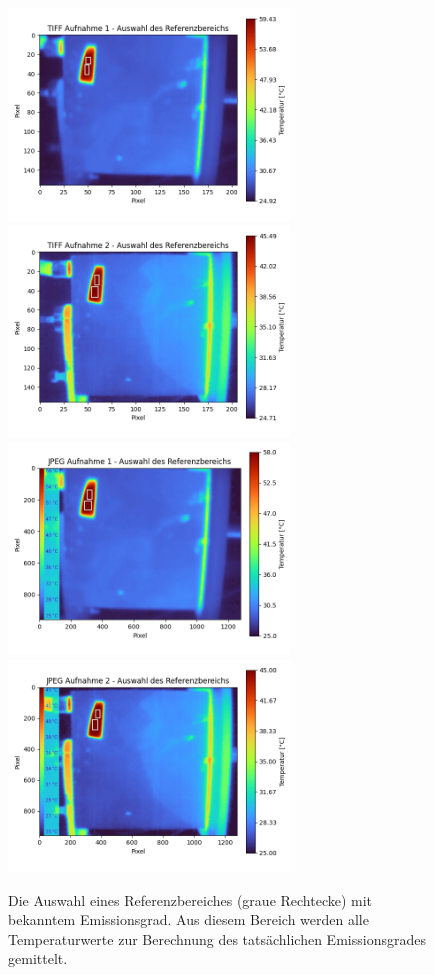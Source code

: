 \documentclass{article}
\begin{document}
\begin{figure}[H]
    \centering
    \captionsetup{width=14cm}
    \includegraphics[width=7.5cm]{img/ref_tiff_1.png}
    \includegraphics[width=7.5cm]{img/ref_tiff_2.png}
    \includegraphics[width=7.5cm]{img/ref_jpg_1.png}
    \includegraphics[width=7.5cm]{img/ref_jpg_2.png}
    \caption{
        Die Auswahl eines Referenzbereiches (graue Rechtecke) mit bekanntem Emissionsgrad.
        Aus diesem Bereich werden alle Temperaturwerte zur Berechnung des tatsächlichen Emissionsgrades gemittelt. 
    }
\end{figure}
\end{document}
